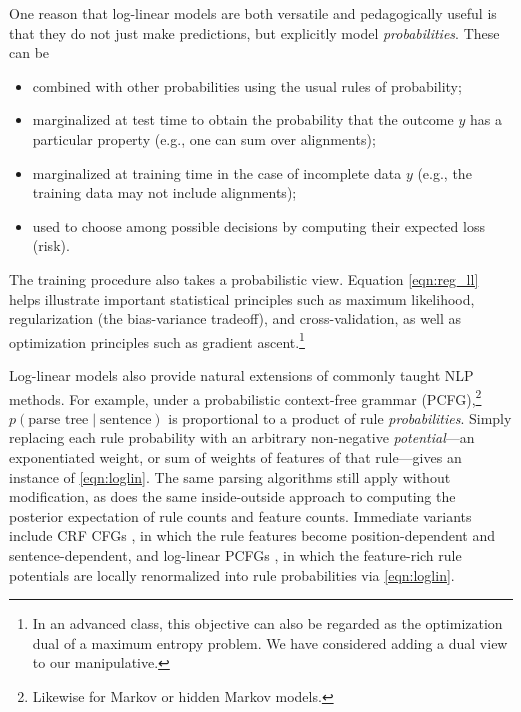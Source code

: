\documentclass[11pt,letterpaper]{article}
\begin{document}
One reason that log-linear models are both versatile and pedagogically
useful is that they do not just make predictions, but explicitly 
model {\em probabilities}.  These can be 
\begin{itemize}
\item combined with other probabilities using the usual rules of probability;
\item marginalized at test time to obtain the probability that the outcome 
  $y$ has a particular property (e.g., one can sum over alignments);
\item marginalized at training time in the case of incomplete data $y$
  (e.g., the training data may not include alignments);
\item used to choose among possible decisions by computing their 
  expected loss (risk).
\end{itemize}
The training procedure also takes a probabilistic view.  Equation
\eqref{eqn:reg_ll} helps illustrate important statistical principles such as maximum
likelihood, regularization (the bias-variance tradeoff), and cross-validation, as well as
optimization principles such as gradient ascent.\footnote{In an
  advanced class, this objective can also be regarded as the
  optimization dual of a maximum entropy problem.  We have considered
  adding a dual view to our manipulative.}

Log-linear models also provide natural extensions of commonly taught
NLP methods.  For example, under a probabilistic context-free
grammar (PCFG),\footnote{Likewise for Markov or hidden Markov models.}  $p(\text{parse tree}\mid\text{sentence})$ is proportional to
a product of rule {\em probabilities}.  Simply replacing each rule
probability with an arbitrary non-negative {\em potential}---an
exponentiated weight, or sum of weights of features of that
rule---gives an instance of \eqref{eqn:loglin}.  The same parsing
algorithms still apply without modification, as does the same
inside-outside approach to computing the posterior expectation of rule counts and 
feature counts.  Immediate variants include CRF CFGs
\cite{finkel2008efficient}, in which the rule features become
position-dependent and sentence-dependent, and log-linear PCFGs
\cite{bergkirkpatrick-et-al-2010}, in which the feature-rich rule
potentials are locally renormalized into rule probabilities via
\eqref{eqn:loglin}.

\end{document}
